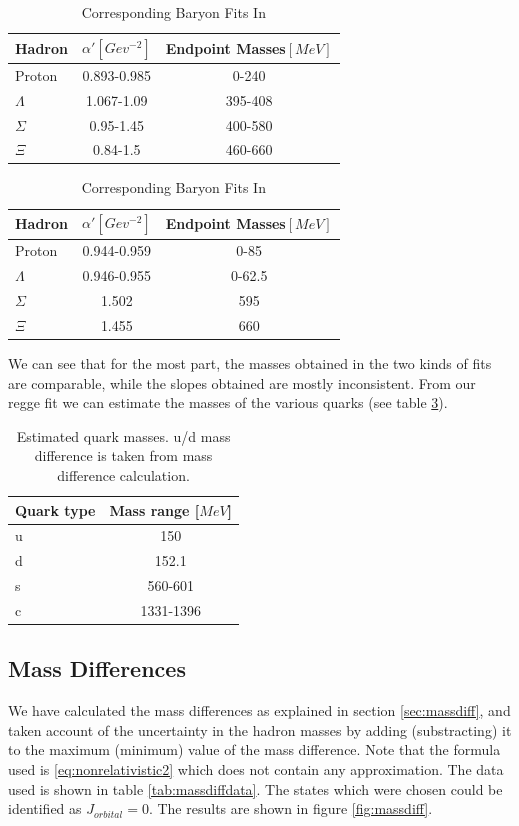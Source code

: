 \documentclass[11pt,a4paper]{article}
\begin{document}
\begin{table}
\centering
\begin{tabular}{|l|c|c|}
\hline
Hadron & $\alpha '\left[Gev^{-2}\right]$ & Endpoint Masses$\left[MeV\right]$ \\ \hline
Proton & 0.893-0.985 & 0-240 \\
$\Lambda$ & 1.067-1.09 & 395-408 \\
$\Sigma$ & 0.95-1.45 & 400-580 \\
$\Xi$  & 0.84-1.5 & 460-660 \\
\hline
\end{tabular}
\caption{Baryon Fits Summary Table}
\label{tab:baryonsum}

\centering
\begin{tabular}{|l|c|c|}
\hline
Hadron & $\alpha '\left[Gev^{-2}\right]$ & Endpoint Masses$\left[MeV\right]$ \\ \hline
Proton & 0.944-0.959 & 0-85 \\
$\Lambda$ & 0.946-0.955 & 0-62.5 \\
$\Sigma$ & 1.502 & 595 \\
$\Xi$  & 1.455 & 660 \\
\hline
\end{tabular}
\caption{Corresponding Baryon Fits In \cite{Sonnenschein15}}
\label{tab:baryonsumdorin}
\end{table}

We can see that for the most part, the masses obtained in the two kinds of fits are comparable, while the slopes obtained are mostly inconsistent. From our regge fit we can estimate the masses of the various quarks  (see table \ref{tab:quarkmasses}).

\begin{table}
\centering
\begin{tabular}{|l|c|}
\hline
Quark type & Mass range [$MeV$] \\ \hline
u & 150\\ \hline
d & 152.1 \\ \hline
s & 560-601\\ \hline
c & 1331-1396\\ \hline
\end{tabular}
\caption{Estimated quark masses. u/d mass difference is taken from mass difference calculation.}
\label{tab:quarkmasses}
\end{table}

\FloatBarrier
\subsection{Mass Differences}
\label{sec:confrontmassdiff}
We have calculated the mass differences as explained in section \ref{sec:massdiff}, and taken account of the uncertainty in the hadron masses by adding (substracting) it to the maximum (minimum) value of the mass difference. Note that the formula used is \ref{eq:nonrelativistic2} which does not contain any approximation. The data used is shown in table \ref{tab:massdiffdata}. The states   which were chosen could be identified as $J_{orbital}=0$. The results are shown in figure \ref{fig:massdiff}.
\end{document}

